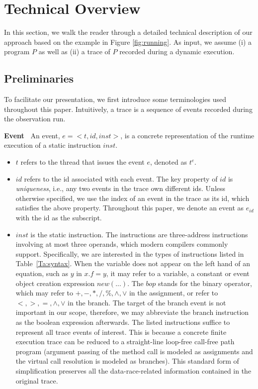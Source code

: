 \section{Technical Overview}\label{sec:overview}

In this section, we walk the reader through a detailed technical description of our approach based on the example in Figure \ref{fig:running}. 
%
As input, we assume (i) a program $P$ as well as (ii) a trace of $P$ recorded during a dynamic execution.



\subsection{Preliminaries}
To facilitate our presentation, we first introduce some terminologies used throughout this paper. Intuitively, a trace is a sequence of events recorded during the observation run.




{\bf Event\ } An event, $e=<t, id, inst>$, is a concrete representation of the runtime execution of a static instruction $inst$.


\begin{itemize}
\item $t$ refers to the thread that issues the event $e$, denoted as $t^e$.
\item  $id$ refers to the id associated with each event. The key property of  $id$ is {\em uniqueness}, i.e., any two events in the trace own different ids.  Unless otherwise specified, we use  the index of an event in the trace as its id, which satisfies the above property. Throughout this paper,  we denote an event as $e_{id}$ with the id as the subscript. %
\item $inst$ is the static instruction. The instructions are three-address instructions involving at most three operands, which modern compilers commonly support.  Specifically, we are interested in the types of instructions listed in Table~\ref{Ta:syntax}. When the variable does not appear on the left hand of an equation, such as $y$ in $x.f=y$, it may refer to a variable, a constant or event object creation expression $new (...)$.  The $bop$ stands for the binary operator, which may refer to $+, -, *, /, \%, \wedge, \vee$ in the assignment, or refer to $<, >, =, \wedge, \vee$ in the branch. The target of the branch event is not important in our scope, therefore, we may abbreviate the branch instruction as the boolean expression afterwards. The listed instructions suffice to represent all trace events of interest. This is because a concrete finite execution trace can be reduced to a straight-line loop-free call-free path program  (argument passing of the method call is modeled as assignments and the virtual call resolution is modeled as branches). This standard form of simplification preserves all the data-race-related information contained in the original trace. 
\end{itemize}




